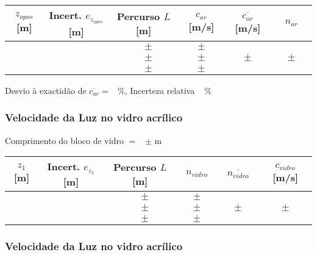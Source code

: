 \documentclass[a4paper,12pt]{article}  %
\begin{document}
\begin{center}
	\begin{tabular}{|c|c|c|c|c|c|}
	\hline
	 $z_{opos}$  [m]   &  Incert. $e_{z_{opos}}$  [m] & Percurso $L$ [m] & $c_{ar}$  [m/s]& $\overline{c_{ar}}$ [m/s]	& $n_{ar}$ \\
	\hline \hline
	  &  & $ \quad \pm $ & $ \quad \pm \quad $ &  & \\ \cline{1-4}
	  &  & $ \quad \pm $ & $ \quad \pm \quad$ & $ \quad \pm \quad$  & $ \quad \pm \quad$ \\ \cline{1-4}
	  &  & $ \quad \pm $ & $ \quad \pm \quad $ &  & \\ \hline
			\end{tabular}
\end{center}

\noindent Desvio à exactidão de $\overline{c_{ar}} =$~\underline{\makebox[1cm][r]{~}} \%, 
 Incerteza relativa  ~\underline{\makebox[1cm][r]{~}} \%


\subsubsection{\sf Velocidade da Luz no vidro acrílico}\label{sec:dados_ar}

\noindent Comprimento do bloco de vidro $=$~\underline{\makebox[1cm][r]{~}} $\pm$ \underline{\makebox[1cm][r]{~}} m  

\begin{center}
	\begin{tabular}{|c|c|c|c|c|c|}
	\hline
	 $z_{1}$  [m]   &  Incert. $e_{z_{1}}$  [m] & Percurso $L$ [m] & $n_{vidro}$  & $\overline{n_{vidro}}$ & $c_{vidro}$ [m/s]\\
	\hline \hline
	  &  & $ \quad \pm $ & $ \quad \pm \quad $ &  & \\ \cline{1-4}
	  &  & $ \quad \pm $ & $ \quad \pm \quad$ & $ \quad \pm \quad$  & $ \quad \pm \quad$ \\ \cline{1-4}
	  &  & $ \quad \pm $ & $ \quad \pm \quad $ &  & \\ \hline
			\end{tabular}
\end{center}

\subsubsection{\sf Velocidade da Luz no vidro acrílico}\label{sec:dados_ar}
\end{document}
